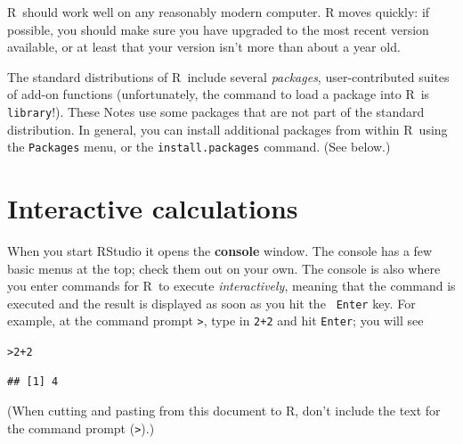 \documentclass[11pt]{article}\usepackage[]{graphicx}\usepackage[]{color}
\makeatletter
\newcommand{\hlnum}[1]{\textcolor[rgb]{0.686,0.059,0.569}{#1}}%
\newcommand{\hlopt}[1]{\textcolor[rgb]{0,0,0}{#1}}%
\newcommand{\hlstd}[1]{\textcolor[rgb]{0.345,0.345,0.345}{#1}}%
\newenvironment{kframe}{%
 \def\at@end@of@kframe{}%
 \ifinner\ifhmode%
  \def\at@end@of@kframe{\end{minipage}}%
  \begin{minipage}{\columnwidth}%
 \fi\fi%
 \def\FrameCommand##1{\hskip\@totalleftmargin \hskip-\fboxsep
 \colorbox{shadecolor}{##1}\hskip-\fboxsep
     \hskip-\linewidth \hskip-\@totalleftmargin \hskip\columnwidth}%
 \MakeFramed {\advance\hsize-\width
   \@totalleftmargin\z@ \linewidth\hsize
   \@setminipage}}%
 {\par\unskip\endMakeFramed%
 \at@end@of@kframe}
\newenvironment{knitrout}{}{} %
\newcommand{\windows}{\textcircled{w}}
\newcommand{\code}[1]{{\tt #1}}
\newcommand{\flspecific}[1]{\emph{#1}}
\newcommand\R{{\sf R}}
\numberwithin{exercise}{section}
\makeatother
\begin{document}
\R\ should work well on any reasonably modern computer.
R moves quickly: if possible, you should make
sure you have upgraded to the most recent version
available, or at least that your version isn't more
than about a year old.


The standard distributions of \R\ include several \emph{packages},
user-contributed suites of add-on functions (unfortunately, the
command to load a package into \R\ is \code{library}!).  These
Notes use some packages that are not part of the standard
distribution. In general, you can install additional packages 
from within \R\ using the \code{Packages} menu,
or the \code{install.packages} command.
(See below.)



\section{Interactive calculations}

When you start RStudio it opens the \textbf{console} window.
The console has a few basic menus at the top; check them out on your own. The console is 
also where you enter commands for \R\ to execute
\emph{interactively}, meaning that the command is executed and 
the result is displayed as soon as you hit the \code{ Enter} key. For example, at 
the command prompt \code{>}, type in \code{2+2} and hit \code{Enter}; you will see 
\begin{knitrout}
\color{fgcolor}\begin{kframe}
\begin{alltt}
\hlstd{> }\hlnum{2} \hlopt{+} \hlnum{2}
\end{alltt}
\begin{verbatim}
## [1] 4
\end{verbatim}
\end{kframe}
\end{knitrout}
\noindent (When cutting and pasting from this document to \R, don't include the
text for the command prompt (\code{>}).)
\end{document}
